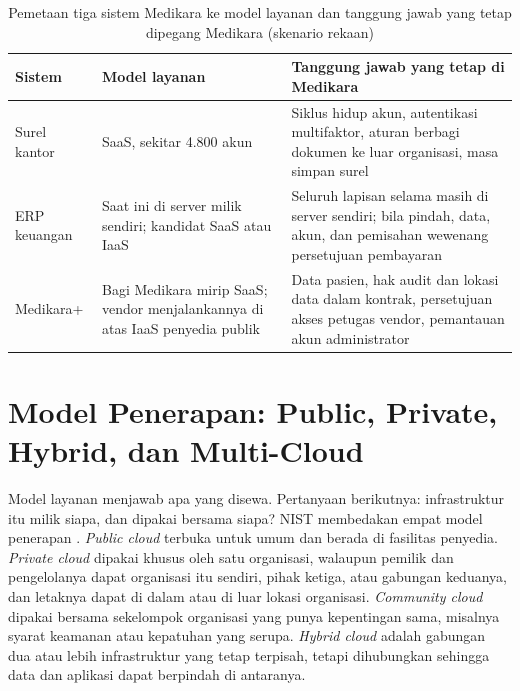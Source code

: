 \begin{table}[!htb]
  \centering
  \caption{Pemetaan tiga sistem Medikara ke model layanan dan tanggung jawab yang tetap
           dipegang Medikara (skenario rekaan)}
  \label{tab:ch02-peta-layanan}
  \small
  \begin{tabularx}{\textwidth}{>{\raggedright\arraybackslash}p{2.0cm}
      >{\raggedright\arraybackslash}p{2.6cm} >{\raggedright\arraybackslash}X}
    \hline
    \textbf{Sistem} & \textbf{Model layanan} & \textbf{Tanggung jawab yang tetap di Medikara}
      \\
    \hline
    Surel kantor & SaaS, sekitar 4.800 akun & Siklus hidup akun, autentikasi multifaktor,
      aturan berbagi dokumen ke luar organisasi, masa simpan surel \\
    \hline
    ERP keuangan & Saat ini di server milik sendiri; kandidat SaaS atau IaaS & Seluruh
      lapisan selama masih di server sendiri; bila pindah, data, akun, dan pemisahan
      wewenang persetujuan pembayaran \\
    \hline
    Medikara+ & Bagi Medikara mirip SaaS; vendor menjalankannya di atas IaaS penyedia
      publik & Data pasien, hak audit dan lokasi data dalam kontrak, persetujuan akses
      petugas vendor, pemantauan akun administrator \\
    \hline
  \end{tabularx}
\end{table}

\section{Model Penerapan: Public, Private, Hybrid, dan Multi-Cloud}

Model layanan menjawab apa yang disewa. Pertanyaan berikutnya: infrastruktur itu milik
siapa, dan dipakai bersama siapa? NIST membedakan empat model penerapan \cite{nist800-145}.
\textit{Public cloud} terbuka untuk umum dan berada di fasilitas penyedia. \textit{Private
cloud} dipakai khusus oleh satu organisasi, walaupun pemilik dan pengelolanya dapat
organisasi itu sendiri, pihak ketiga, atau gabungan keduanya, dan letaknya dapat di dalam
atau di luar lokasi organisasi. \textit{Community cloud} dipakai bersama sekelompok
organisasi yang punya kepentingan sama, misalnya syarat keamanan atau kepatuhan yang
serupa. \textit{Hybrid cloud} adalah gabungan dua atau lebih infrastruktur yang tetap
terpisah, tetapi dihubungkan sehingga data dan aplikasi dapat berpindah di antaranya.

